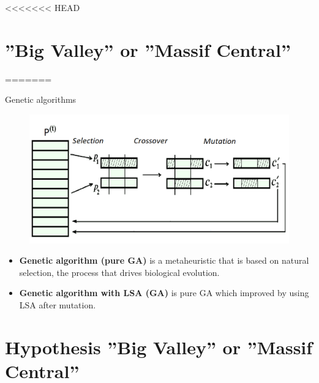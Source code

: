 \documentclass[aspectratio=169,xcolor=dvipsnames]{beamer}
\begin{document}
<<<<<<< HEAD
\section{''Big Valley'' or ''Massif Central''}
=======

\begin{frame}{Genetic algorithms}
    \begin{figure}
    \includegraphics[scale=0.4]{schGA}
    \end{figure}
\begin{itemize}
\item \textbf{Genetic algorithm (pure GA)} is a metaheuristic that is based on natural selection, the process that drives biological evolution.
\item \textbf{Genetic algorithm with LSA (GA)} is pure GA which improved by using LSA after mutation.
\end{itemize}
    
\end{frame}

\section{Hypothesis ''Big Valley'' or ''Massif Central''}
\end{document}

